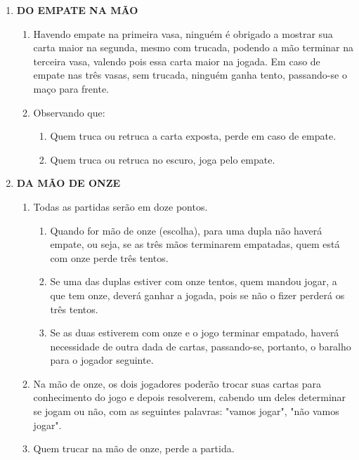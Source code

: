 \begin{article}
\begin{enumerate}[noitemsep]
		\item \textbf{DO EMPATE NA MÃO}
		\begin{enumerate}[noitemsep]
			\item Havendo empate na primeira vasa, ninguém é obrigado a mostrar sua carta maior na segunda, mesmo com trucada, podendo a mão terminar na terceira vasa, valendo pois essa carta maior na jogada. Em caso de empate nas três vasas, sem trucada, ninguém ganha tento, passando-se o maço para frente.
			\item Observando que:
			\begin{enumerate}[noitemsep]
				\item Quem truca ou retruca a carta exposta, perde em caso de empate.
				\item Quem truca ou retruca no escuro, joga pelo empate.
			\end{enumerate}
		\end{enumerate}

		\item \textbf{DA MÃO DE ONZE}
		\begin{enumerate}[noitemsep]
			\item Todas as partidas serão em doze pontos.
			\begin{enumerate}[noitemsep]
				\item Quando for mão de onze (escolha), para uma dupla não haverá empate, ou seja, se as três mãos terminarem empatadas, quem está com onze perde três tentos.
				\item Se uma das duplas estiver com onze tentos, quem mandou jogar, a que tem onze, deverá ganhar a jogada, pois se não o fizer perderá os três tentos.
				\item Se as duas estiverem com onze e o jogo terminar empatado, haverá necessidade de outra dada de cartas, passando-se, portanto, o baralho para o jogador seguinte.
			\end{enumerate}
			\item Na mão de onze, os dois jogadores poderão trocar suas cartas para conhecimento do jogo e depois resolverem, cabendo um deles determinar se jogam ou não, com as seguintes palavras: "vamos jogar", "não vamos jogar".
			\item Quem trucar na mão de onze, perde a partida.
		\end{enumerate}
	\end{enumerate}
\end{article}
